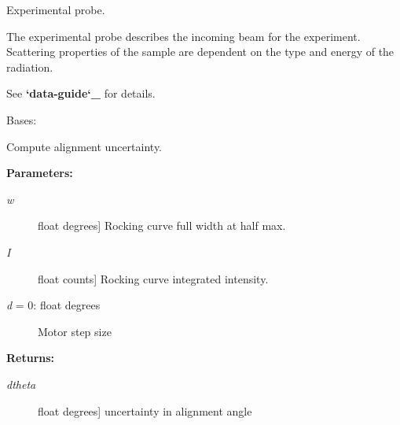 \documentclass[letterpaper,10pt,english]{sphinxmanual}
\begin{document}
\label{api/probe:module-refl1d.probe}
Experimental probe.

The experimental probe describes the incoming beam for the experiment.
Scattering properties of the sample are dependent on the type and
energy of the radiation.

See {\color{red}\bfseries{}{}`data-guide{}`\_} for details.

\begin{fulllineitems}
\label{api/probe:refl1d.probe.NeutronProbe}
Bases: {\hyperref[api/probe:refl1d.probe.Probe]{}}

\begin{fulllineitems}
\label{api/probe:refl1d.probe.NeutronProbe.Q}
\end{fulllineitems}


\begin{fulllineitems}
\label{api/probe:refl1d.probe.NeutronProbe.alignment_uncertainty}
Compute alignment uncertainty.

\textbf{Parameters:}
\begin{description}
\item[{\emph{w}}] \leavevmode{[}float \textbar{} degrees{]}
Rocking curve full width at half max.

\item[{\emph{I}}] \leavevmode{[}float \textbar{} counts{]}
Rocking curve integrated intensity.

\item[{\emph{d} = 0: float \textbar{} degrees}] \leavevmode
Motor step size

\end{description}

\textbf{Returns:}
\begin{description}
\item[{\emph{dtheta}}] \leavevmode{[}float \textbar{} degrees{]}
uncertainty in alignment angle


\end{description}
\end{fulllineitems}
\end{fulllineitems}
\end{document}
